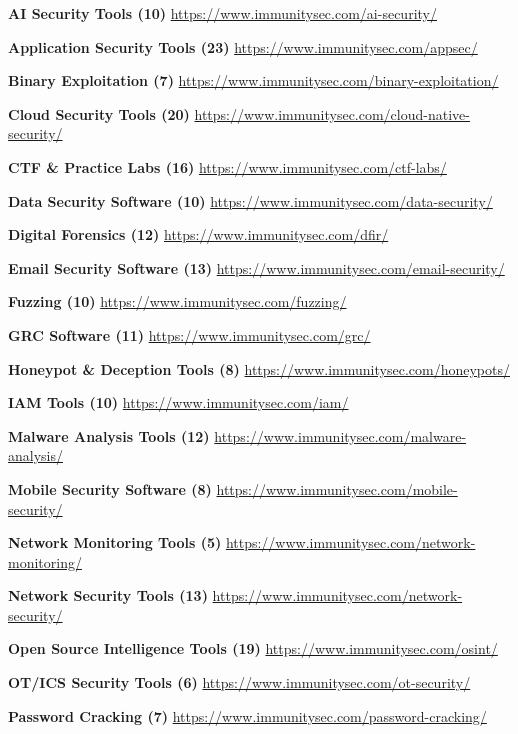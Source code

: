 \documentclass[11pt,oneside]{report}
\begin{document}
\noindent\textbf{AI Security Tools (10)} \hfill \url{https://www.immunitysec.com/ai-security/}\par
\noindent\textbf{Application Security Tools (23)} \hfill \url{https://www.immunitysec.com/appsec/}\par
\noindent\textbf{Binary Exploitation (7)} \hfill \url{https://www.immunitysec.com/binary-exploitation/}\par
\noindent\textbf{Cloud Security Tools (20)} \hfill \url{https://www.immunitysec.com/cloud-native-security/}\par
\noindent\textbf{CTF \& Practice Labs (16)} \hfill \url{https://www.immunitysec.com/ctf-labs/}\par
\noindent\textbf{Data Security Software (10)} \hfill \url{https://www.immunitysec.com/data-security/}\par
\noindent\textbf{Digital Forensics (12)} \hfill \url{https://www.immunitysec.com/dfir/}\par
\noindent\textbf{Email Security Software (13)} \hfill \url{https://www.immunitysec.com/email-security/}\par
\noindent\textbf{Fuzzing (10)} \hfill \url{https://www.immunitysec.com/fuzzing/}\par
\noindent\textbf{GRC Software (11)} \hfill \url{https://www.immunitysec.com/grc/}\par
\noindent\textbf{Honeypot \& Deception Tools (8)} \hfill \url{https://www.immunitysec.com/honeypots/}\par
\noindent\textbf{IAM Tools (10)} \hfill \url{https://www.immunitysec.com/iam/}\par
\noindent\textbf{Malware Analysis Tools (12)} \hfill \url{https://www.immunitysec.com/malware-analysis/}\par
\noindent\textbf{Mobile Security Software (8)} \hfill \url{https://www.immunitysec.com/mobile-security/}\par
\noindent\textbf{Network Monitoring Tools (5)} \hfill \url{https://www.immunitysec.com/network-monitoring/}\par
\noindent\textbf{Network Security Tools (13)} \hfill \url{https://www.immunitysec.com/network-security/}\par
\noindent\textbf{Open Source Intelligence Tools (19)} \hfill \url{https://www.immunitysec.com/osint/}\par
\noindent\textbf{OT/ICS Security Tools (6)} \hfill \url{https://www.immunitysec.com/ot-security/}\par
\noindent\textbf{Password Cracking (7)} \hfill \url{https://www.immunitysec.com/password-cracking/}\par
\end{document}

